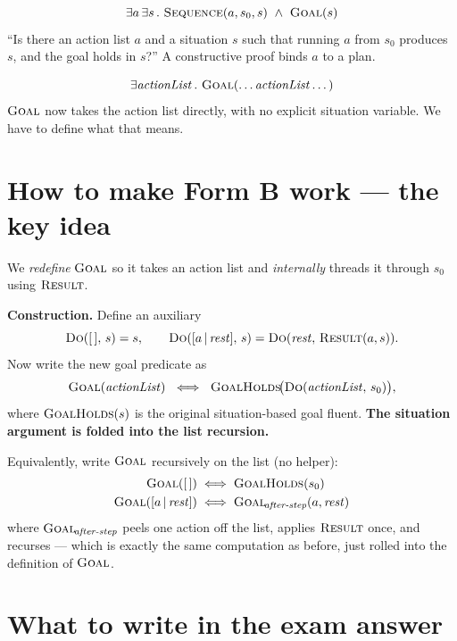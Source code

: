 \documentclass[11pt,a4paper]{article}
\newcommand{\sit}[1]{\textit{#1}}
\newcommand{\pred}[1]{\textsc{#1}}
\begin{document}
\begin{tcolorbox}[colback=gray!5,colframe=gray!50!black,title=Form A --- explicit situation]
\[
  \exists a \, \exists s \,.\ \pred{Sequence}(a, s_0, s)\ \wedge\ \pred{Goal}(s)
\]
``Is there an action list $a$ and a situation $s$ such that running $a$ from $s_0$ produces $s$, and the goal holds in $s$?'' A constructive proof binds $a$ to a plan.
\end{tcolorbox}

\begin{tcolorbox}[colback=gray!5,colframe=gray!50!black,title=Form B --- situation hidden]
\[
  \exists \mathit{actionList} \,.\ \pred{Goal}(\dots\mathit{actionList}\dots)
\]
$\pred{Goal}$ now takes the action list directly, with no explicit situation variable. We have to define what that means.
\end{tcolorbox}

\section*{How to make Form B work --- the key idea}

We \emph{redefine} $\pred{Goal}$ so it takes an action list and \emph{internally} threads it through $s_0$ using $\pred{Result}$.

\textbf{Construction.} Define an auxiliary
\[
  \pred{Do}([\,],\, s) = s, \qquad
  \pred{Do}([a\,|\,\mathit{rest}],\, s) = \pred{Do}(\mathit{rest},\, \pred{Result}(a, s)).
\]
Now write the new goal predicate as
\[
  \pred{Goal}(\mathit{actionList}) \ \iff\ \pred{GoalHolds}\!\big(\pred{Do}(\mathit{actionList},\, s_0)\big),
\]
where $\pred{GoalHolds}(s)$ is the original situation-based goal fluent. \textbf{The situation argument is folded into the list recursion.}

Equivalently, write $\pred{Goal}$ recursively on the list (no helper):
\begin{align*}
  \pred{Goal}([\,]) &\iff \pred{GoalHolds}(s_0)\\
  \pred{Goal}([a\,|\,\mathit{rest}]) &\iff \pred{Goal}_{\!\sit{after-step}}(a, \mathit{rest})
\end{align*}
where $\pred{Goal}_{\!\sit{after-step}}$ peels one action off the list, applies $\pred{Result}$ once, and recurses --- which is exactly the same computation as before, just rolled into the definition of $\pred{Goal}$.

\section*{What to write in the exam answer}
\end{document}

